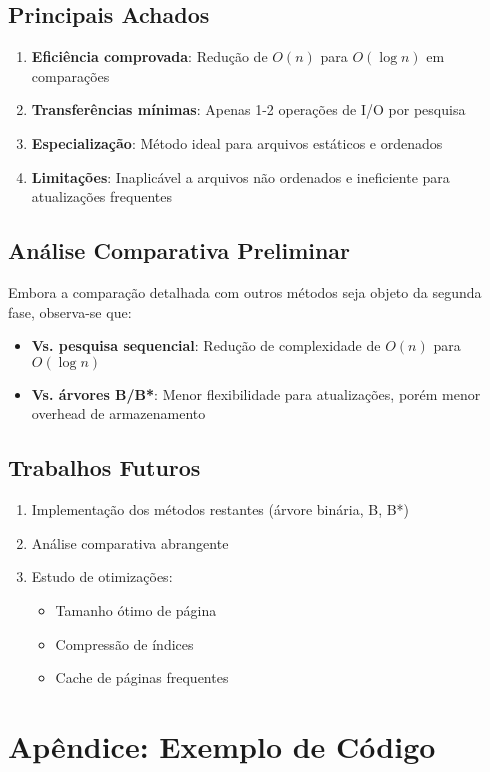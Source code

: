 \documentclass[12pt,a4paper,brazil]{article}
\begin{document}
\subsection{Principais Achados}
\begin{enumerate}
    \item \textbf{Eficiência comprovada}: Redução de \(O(n)\) para \(O(\log n)\) em comparações
    \item \textbf{Transferências mínimas}: Apenas 1-2 operações de I/O por pesquisa
    \item \textbf{Especialização}: Método ideal para arquivos estáticos e ordenados
    \item \textbf{Limitações}: Inaplicável a arquivos não ordenados e ineficiente para atualizações frequentes
\end{enumerate}

\subsection{Análise Comparativa Preliminar}
Embora a comparação detalhada com outros métodos seja objeto da segunda fase, observa-se que:
\begin{itemize}
    \item \textbf{Vs. pesquisa sequencial}: Redução de complexidade de \(O(n)\) para \(O(\log n)\)
    \item \textbf{Vs. árvores B/B*}: Menor flexibilidade para atualizações, porém menor overhead de armazenamento
\end{itemize}

\subsection{Trabalhos Futuros}
\begin{enumerate}
    \item Implementação dos métodos restantes (árvore binária, B, B*)
    \item Análise comparativa abrangente
    \item Estudo de otimizações:
    \begin{itemize}
        \item Tamanho ótimo de página
        \item Compressão de índices
        \item Cache de páginas frequentes
    \end{itemize}
\end{enumerate}

\section*{Apêndice: Exemplo de Código}
\end{document}
